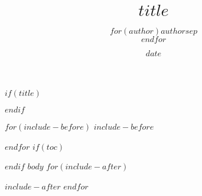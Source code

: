\documentclass[ebook,article,oneside,english]{memoir}
\title{$title$}
\author{$for(author)$$author$$sep$\\$endfor$}
\date{$date$}
\date{}
\begin{document}
$if(title)$
\maketitle
$endif$

$for(include-before)$
$include-before$

$endfor$
$if(toc)$
\tableofcontents

$endif$
$body$
$for(include-after)$

$include-after$
$endfor$
\end{document}

